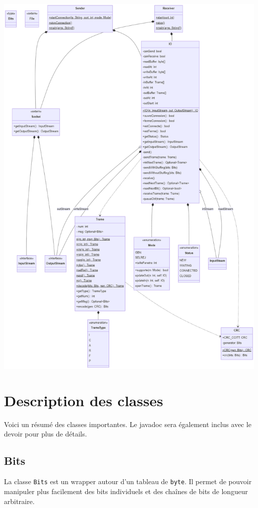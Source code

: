 \documentclass{article}
\begin{document}
\includegraphics[scale=.37]{dc.png}

\clearpage

\section{Description des classes}
    Voici un résumé des classes importantes. Le javadoc sera également inclus avec le devoir pour plus de détails.
    
    \subsection{Bits}
    La classe \verb#Bits# est un wrapper autour d'un tableau de \verb#byte#. Il permet de pouvoir manipuler plus facilement des bits individuels et des chaînes de bits de longueur arbitraire.
    
\end{document}
